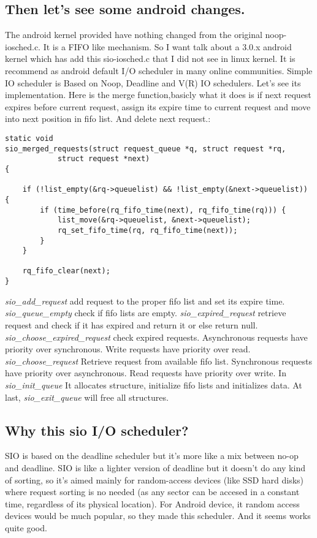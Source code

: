 \documentclass[12pt,letterpaper]{article}
\begin{document}
\subsection{Then let's see some android changes.}
\indent The android kernel provided have nothing changed from the original noop-iosched.c. It is a FIFO like mechanism. \newline 
\indent So I want talk about a 3.0.x android kernel which has add this sio-iosched.c that I did not see in linux kernel. It is recommend as android default I/O scheduler in many online communities. Simple IO scheduler is Based on Noop, Deadline and V(R) IO schedulers. Let's see its implementation.\newline
Here is the merge function,basicly what it does is if next request expires before current request, assign its expire time to current request and move into next position in fifo list. And delete next request.:
\begin{Verbatim}[frame=single]
static void
sio_merged_requests(struct request_queue *q, struct request *rq,
		    struct request *next)
{
	
	if (!list_empty(&rq->queuelist) && !list_empty(&next->queuelist)) {
		if (time_before(rq_fifo_time(next), rq_fifo_time(rq))) {
			list_move(&rq->queuelist, &next->queuelist);
			rq_set_fifo_time(rq, rq_fifo_time(next));
		}
	}

	rq_fifo_clear(next);
}
\end{Verbatim}
\emph{sio_add_request} add request to the proper fifo list and set its expire time. \emph{sio_queue_empty} check if fifo lists are empty. \emph{sio_expired_request} retrieve request and check if it has expired and return it or else return null. \emph{sio_choose_expired_request} check expired requests. Asynchronous requests have priority over synchronous. Write requests have priority over read. \emph{sio_choose_request} Retrieve request from available fifo list. Synchronous requests have priority over asynchronous. Read requests have priority over write. In \emph{sio_init_queue} It allocates structure, initialize fifo lists and initializes data. At last, \emph {sio_exit_queue} will free all structures.\newline
\subsection{Why this sio I/O scheduler?}
SIO is based on the deadline scheduler but it's more like a mix between no-op and deadline. SIO is like a lighter version of deadline but it doesn't do any kind of sorting, so it's aimed mainly for random-access devices (like SSD hard disks) where request sorting is no needed (as any sector can be accesed in a constant time, regardless of its physical location). For Android device, it random access devices would be much popular, so they made this scheduler. And it seems works quite good.
\end{document}
